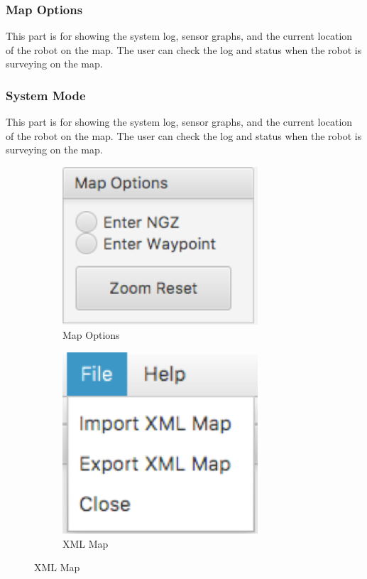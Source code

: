 \documentclass[10pt,a4paper,titlepage]{article}
\begin{document}
   
  \subsubsection{  Map Options} 
This part is for showing the system log, sensor graphs, and the current location of the robot on the map. The user can check the log and status when the robot is surveying on the map.   
   
   
  \subsubsection{  System Mode} 
This part is for showing the system log, sensor graphs, and the current location of the robot on the map. The user can check the log and status when the robot is surveying on the map.
  
 
 \begin{figure}[H]
 	\centering
 	\begin{subfigure}[t]{0.45\textwidth}
  	\includegraphics[width=0.8\textwidth]{options.png}  %
	\caption{Map Options} 
	\label{fig:Map Options}               
 	\end{subfigure}
 	\begin{subfigure}[t]{0.45\textwidth}
  \includegraphics[width=0.8\textwidth]{xml.png}  %
\caption{XML Map} 
\label{fig:XML Map}              
 	\end{subfigure}
 \end{figure}
 
\end{document}
